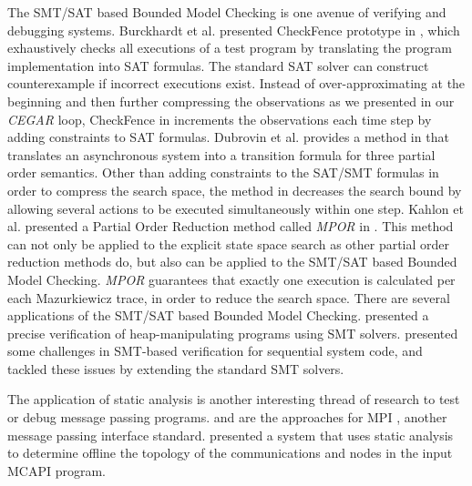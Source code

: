 The SMT/SAT based Bounded Model Checking is one avenue of verifying and debugging systems. Burckhardt et al. presented CheckFence prototype in \cite{burckhardt:pldi07}, which exhaustively checks all executions of a test program by translating the program implementation into SAT formulas. The standard SAT solver can construct counterexample if incorrect executions exist. Instead of over-approximating at the beginning and then further compressing the observations as we presented in our \textit{CEGAR} loop, CheckFence in \cite{burckhardt:pldi07} increments the observations each time step by adding constraints to SAT formulas. Dubrovin et al. provides a method in \cite{heljanko:scp} that translates an asynchronous system into a transition formula for three partial order semantics. Other than adding constraints to the SAT/SMT formulas in order to compress the search space, the method in \cite{heljanko:scp} decreases the search bound by allowing several actions to be executed simultaneously within one step. Kahlon et al. presented a Partial Order Reduction method called \textit{MPOR} in \cite{kahlon:cav09}. This method can not only be applied to the explicit state space search as other partial order reduction methods do, but also can be applied to the SMT/SAT based Bounded Model Checking. \textit{MPOR} guarantees that exactly one execution is calculated per each Mazurkiewicz trace, in order to reduce the search space. There are several applications of the SMT/SAT based Bounded Model Checking. \cite{lahiri:popl08} presented a precise verification of heap-manipulating programs using SMT solvers. \cite{lahiri:cav11} presented some challenges in SMT-based verification for sequential system code, and tackled these issues by extending the standard SMT solvers.

The application of static analysis is another interesting thread of research to test or debug message passing programs. \cite{zhang:ppopp07} and \cite{greg:cgo09} are the approaches for MPI \cite{mpi}, another message passing interface standard. \cite{gray:lctes11} presented a system that uses static analysis to determine offline the topology of the communications and nodes in the input MCAPI program.
